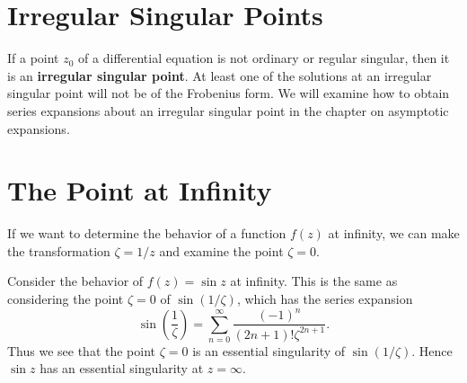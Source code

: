 



































\section{Irregular Singular Points}

If a point $z_0$ of a differential equation is not ordinary or regular 
singular, then it is an \textbf{irregular singular point}.
At least one of the solutions at an irregular singular point will not be of
the Frobenius form.  We will examine how to obtain series expansions about
an irregular singular point in the chapter on asymptotic expansions.













\section{The Point at Infinity}

If we want to determine the behavior of a function $f(z)$ at infinity,
we can make the transformation $\zeta = 1 / z$ and examine the point $\zeta = 0$.


\begin{Example}
  Consider the behavior of $f(z) = \sin z$ at infinity.
  This is the same as considering the point $\zeta = 0$ of $\sin(1/\zeta)$, which
  has the series expansion
  \[ 
  \sin \left( \frac{1}{\zeta} \right)
  = \sum_{n=0}^\infty \frac{(-1)^n}{(2 n + 1)! \zeta^{2n+1}}. 
  \]
  Thus we see that the point $\zeta = 0$ is an essential singularity of 
  $\sin(1/\zeta)$.  Hence $\sin z$ has an essential singularity at $z = \infty$.
\end{Example}








